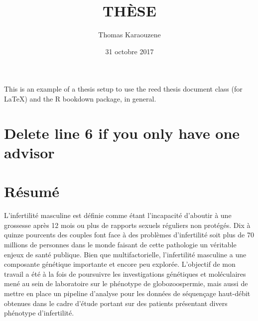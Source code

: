 \documentclass[12pt,twoside]{reedthesis}
\title{THÈSE}
\author{Thomas Karaouzene}
\date{31 octobre 2017}
\theoremstyle{definition}
\theoremstyle{definition}
\theoremstyle{remark}
\begin{document}
      \maketitle
  
  \frontmatter %
  \pagestyle{empty} %

  
      \begin{preface}
      This is an example of a thesis setup to use the reed thesis document
      class (for LaTeX) and the R bookdown package, in general.
    \end{preface}
  
      \hypersetup{linkcolor=black}
    \setcounter{tocdepth}{3}
    \tableofcontents
  
      \listoftables
  
      \listoffigures
  
  
  
  \mainmatter %
  \pagestyle{fancyplain} %

  \chapter{Delete line 6 if you only have one
  advisor}\label{delete-line-6-if-you-only-have-one-advisor}
  
  \chapter*{Résumé}\label{resume}
  
  \newpage
  
  L'infertilité masculine est définie comme étant l'incapacité d'aboutir à
  une grossesse après 12 mois ou plus de rapports sexuels réguliers non
  protégés. Dix à quinze pourcents des couples font face à des problèmes
  d'infertilité soit plus de 70 millions de personnes dans le monde
  faisant de cette pathologie un véritable enjeux de santé publique. Bien
  que multifactorielle, l'infertilité masculine a une composante génétique
  importante et encore peu explorée. L'objectif de mon travail a été à la
  fois de poursuivre les investigations génétiques et moléculaires mené au
  sein de laboratoire sur le phénotype de globozoospermie, mais aussi de
  mettre en place un pipeline d'analyse pour les données de séquençage
  haut-débit obtenues dans le cadre d'étude portant sur des patients
  présentant divers phénotype d'infertilité.
  
\end{document}
